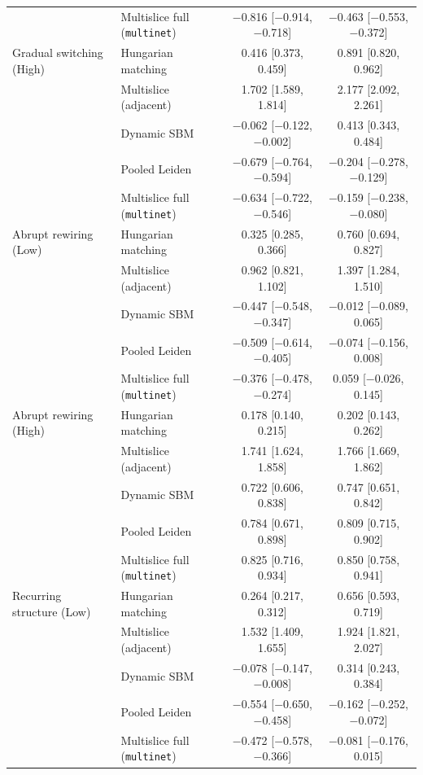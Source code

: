 \documentclass[11pt, letterpaper]{article}
\numberwithin{equation}{section}
\begin{document}
\begin{table}[htbp]
\begin{tabular}{llcc}
 & Multislice full (\texttt{multinet}) & $-$0.816 [$-$0.914, $-$0.718] & $-$0.463 [$-$0.553, $-$0.372] \\
Gradual switching (High) & Hungarian matching & 0.416 [0.373, 0.459] & 0.891 [0.820, 0.962] \\
 & Multislice (adjacent) & 1.702 [1.589, 1.814] & 2.177 [2.092, 2.261] \\
 & Dynamic SBM & $-$0.062 [$-$0.122, $-$0.002] & 0.413 [0.343, 0.484] \\
 & Pooled Leiden & $-$0.679 [$-$0.764, $-$0.594] & $-$0.204 [$-$0.278, $-$0.129] \\
 & Multislice full (\texttt{multinet}) & $-$0.634 [$-$0.722, $-$0.546] & $-$0.159 [$-$0.238, $-$0.080] \\
Abrupt rewiring (Low) & Hungarian matching & 0.325 [0.285, 0.366] & 0.760 [0.694, 0.827] \\
 & Multislice (adjacent) & 0.962 [0.821, 1.102] & 1.397 [1.284, 1.510] \\
 & Dynamic SBM & $-$0.447 [$-$0.548, $-$0.347] & $-$0.012 [$-$0.089, 0.065] \\
 & Pooled Leiden & $-$0.509 [$-$0.614, $-$0.405] & $-$0.074 [$-$0.156, 0.008] \\
 & Multislice full (\texttt{multinet}) & $-$0.376 [$-$0.478, $-$0.274] & 0.059 [$-$0.026, 0.145] \\
Abrupt rewiring (High) & Hungarian matching & 0.178 [0.140, 0.215] & 0.202 [0.143, 0.262] \\
 & Multislice (adjacent) & 1.741 [1.624, 1.858] & 1.766 [1.669, 1.862] \\
 & Dynamic SBM & 0.722 [0.606, 0.838] & 0.747 [0.651, 0.842] \\
 & Pooled Leiden & 0.784 [0.671, 0.898] & 0.809 [0.715, 0.902] \\
 & Multislice full (\texttt{multinet}) & 0.825 [0.716, 0.934] & 0.850 [0.758, 0.941] \\
Recurring structure (Low) & Hungarian matching & 0.264 [0.217, 0.312] & 0.656 [0.593, 0.719] \\
 & Multislice (adjacent) & 1.532 [1.409, 1.655] & 1.924 [1.821, 2.027] \\
 & Dynamic SBM & $-$0.078 [$-$0.147, $-$0.008] & 0.314 [0.243, 0.384] \\
 & Pooled Leiden & $-$0.554 [$-$0.650, $-$0.458] & $-$0.162 [$-$0.252, $-$0.072] \\
 & Multislice full (\texttt{multinet}) & $-$0.472 [$-$0.578, $-$0.366] & $-$0.081 [$-$0.176, 0.015] \\

\end{tabular}
\end{table}
\end{document}
